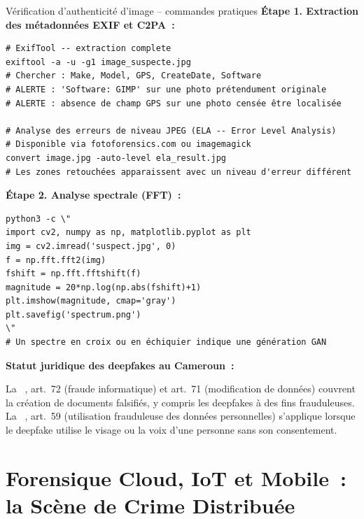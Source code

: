 \begin{boxartefact}{Vérification d'authenticité d'image -- commandes pratiques}
\textbf{Étape 1. Extraction des métadonnées EXIF et C2PA~:}
\begin{lstlisting}[language=bash_forensique]
# ExifTool -- extraction complete
exiftool -a -u -g1 image_suspecte.jpg
# Chercher : Make, Model, GPS, CreateDate, Software
# ALERTE : 'Software: GIMP' sur une photo prétendument originale
# ALERTE : absence de champ GPS sur une photo censée être localisée

# Analyse des erreurs de niveau JPEG (ELA -- Error Level Analysis)
# Disponible via fotoforensics.com ou imagemagick
convert image.jpg -auto-level ela_result.jpg
# Les zones retouchées apparaissent avec un niveau d'erreur différent
\end{lstlisting}

\textbf{Étape 2. Analyse spectrale (FFT)~:}
\begin{lstlisting}[language=bash_forensique]
python3 -c \"
import cv2, numpy as np, matplotlib.pyplot as plt
img = cv2.imread('suspect.jpg', 0)
f = np.fft.fft2(img)
fshift = np.fft.fftshift(f)
magnitude = 20*np.log(np.abs(fshift)+1)
plt.imshow(magnitude, cmap='gray')
plt.savefig('spectrum.png')
\"
# Un spectre en croix ou en échiquier indique une génération GAN
\end{lstlisting}
\end{boxartefact}

\begin{boxjuris}
\textbf{Statut juridique des deepfakes au Cameroun~:}

La ~\cite{cameroun2010a}, art.~72 (fraude informatique) et art.~71
(modification de données) couvrent la création de documents falsifiés,
y compris les deepfakes à des fins frauduleuses. La ~\cite{cameroun2024donnees},
art.~59 (utilisation frauduleuse des données personnelles) s'applique
lorsque le deepfake utilise le visage ou la voix d'une personne sans
son consentement.
\end{boxjuris}

\section{Forensique Cloud, IoT et Mobile~: la Scène de Crime Distribuée}
\label{sec:cloud-iot-mobile}

